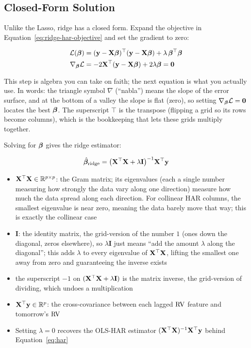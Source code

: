 \subsection{Closed-Form Solution}

Unlike the Lasso, ridge has a closed form.
Expand the objective in Equation~\eqref{eq:ridge-har-objective} and set the gradient to zero:

\begin{align}
  \mathcal{L}(\bm{\beta}) &= (\mathbf{y} - \mathbf{X}\bm{\beta})^\top(\mathbf{y} - \mathbf{X}\bm{\beta}) + \lambda\,\bm{\beta}^\top\bm{\beta} \notag \\
  \nabla_{\bm{\beta}}\mathcal{L} &= -2\mathbf{X}^\top(\mathbf{y} - \mathbf{X}\bm{\beta}) + 2\lambda\bm{\beta} = \mathbf{0}
  \label{eq:ridge-har-gradient}
\end{align}

This step is algebra you can take on faith; the next equation is what you actually use.
In words: the triangle symbol $\nabla$ (``nabla'') means the slope of the error surface, and at the bottom of a valley the slope is flat (zero), so setting $\nabla_{\bm{\beta}}\mathcal{L} = \mathbf{0}$ locates the best $\bm{\beta}$.
The superscript $\top$ is the transpose (flipping a grid so its rows become columns), which is the bookkeeping that lets these grids multiply together.

Solving for $\bm{\beta}$ gives the ridge estimator:

\begin{equation}
  \hat{\bm{\beta}}_{\mathrm{ridge}} = \bigl(\mathbf{X}^\top\mathbf{X} + \lambda\mathbf{I}\bigr)^{-1}\mathbf{X}^\top\mathbf{y}
  \label{eq:ridge-har-closed-form}
\end{equation}
\begin{itemize}[nosep]
  \item $\mathbf{X}^\top\mathbf{X} \in \mathbb{R}^{p\times p}$: the Gram matrix; its eigenvalues (each a single number measuring how strongly the data vary along one direction) measure how much the data spread along each direction. For collinear HAR columns, the smallest eigenvalue is near zero, meaning the data barely move that way; this is exactly the collinear case
  \item $\mathbf{I}$: the identity matrix, the grid-version of the number $1$ (ones down the diagonal, zeros elsewhere), so $\lambda\mathbf{I}$ just means ``add the amount $\lambda$ along the diagonal''; this adds $\lambda$ to every eigenvalue of $\mathbf{X}^\top\mathbf{X}$, lifting the smallest one away from zero and guaranteeing the inverse exists
  \item the superscript $-1$ on $(\mathbf{X}^\top\mathbf{X} + \lambda\mathbf{I})$ is the matrix inverse, the grid-version of dividing, which undoes a multiplication
  \item $\mathbf{X}^\top\mathbf{y} \in \mathbb{R}^p$: the cross-covariance between each lagged $\operatorname{RV}$ feature and tomorrow's $\operatorname{RV}$
  \item Setting $\lambda = 0$ recovers the OLS-HAR estimator $(\mathbf{X}^\top\mathbf{X})^{-1}\mathbf{X}^\top\mathbf{y}$ behind Equation~\eqref{eq:har}
\end{itemize}


